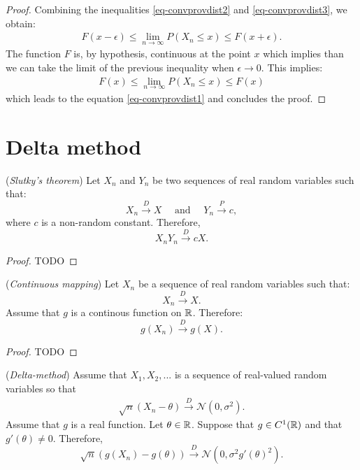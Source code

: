 \documentclass{article}
\begin{document}
\begin{proof}
Combining the inequalities \ref{eq-convprovdist2} and \ref{eq-convprovdist3}, we obtain: 
\begin{align*}
F(x-\epsilon) \leq \lim_{n\rightarrow \infty} P(X_n\leq x)  \leq F(x+\epsilon).
\end{align*}
The function $F$ is, by hypothesis, continuous at the point $x$ which implies than we can take 
the limit of the previous inequality when $\epsilon\rightarrow 0$. 
This implies:
\begin{align*}
F(x) \leq \lim_{n\rightarrow \infty} P(X_n\leq x)  \leq F(x)
\end{align*}
which leads to the equation \ref{eq-convprovdist1} and concludes the proof.
\end{proof}


\section{Delta method}

\begin{theorem}
(\emph{Slutky's theorem})
Let $X_n$ and $Y_n$ be two sequences of real random variables such that:
$$
X_n \xrightarrow{D} X \quad \textrm{ and } \quad Y_n \xrightarrow{P} c,
$$
where $c$ is a non-random constant. 
Therefore, 
$$
X_n Y_n \xrightarrow{D} c X.
$$
\end{theorem}

\begin{proof}
TODO
\end{proof}


\begin{theorem}
(\emph{Continuous mapping})
Let $X_n$ be a sequence of real random variables such that:
$$
X_n \xrightarrow{D} X.
$$
Assume that $g$ is a continous function on $\mathbb{R}$. 
Therefore:
$$
g(X_n) \xrightarrow{D} g(X).
$$
\end{theorem}

\begin{proof}
TODO
\end{proof}


\begin{theorem}
(\emph{Delta-method})
Assume that $X_1,X_2,...$ is a sequence of real-valued random variables 
so that 
\begin{align}
\label{eq-delmeth1}
\sqrt{n} (X_n - \theta) \xrightarrow{D} \mathcal{N}(0,\sigma^2).
\end{align}
Assume that $g$ is a real function. 
Let $\theta\in\mathbb{R}$. 
Suppose that $g\in C^1(\mathbb{R})$ and that $g'(\theta)\neq 0$. 
Therefore, 
$$
\sqrt{n} (g(X_n) - g(\theta)) \xrightarrow{D} \mathcal{N}(0,\sigma^2 g'(\theta)^2).
$$
\end{theorem}
\end{document}
